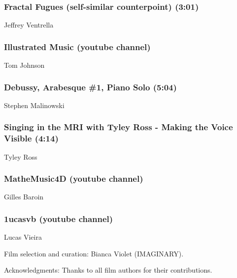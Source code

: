 \subsubsection*{Fractal Fugues (self-similar counterpoint) (3:01)}
Jeffrey Ventrella

\subsubsection*{Illustrated Music (youtube channel)}
Tom Johnson

\subsubsection*{Debussy, Arabesque \#1, Piano Solo (5:04)}
Stephen Malinowski

\subsubsection*{Singing in the MRI with Tyley Ross - Making the Voice Visible (4:14)}
Tyley Ross

\subsubsection*{MatheMusic4D (youtube channel)}
Gilles Baroin

\subsubsection*{1ucasvb (youtube channel)}
Lucas Vieira

\begin{sectcredits}
\item[Film selection and curation:] Bianca Violet (IMAGINARY).
\item[Acknowledgments:] Thanks to all film authors for their contributions.
\end{sectcredits}
